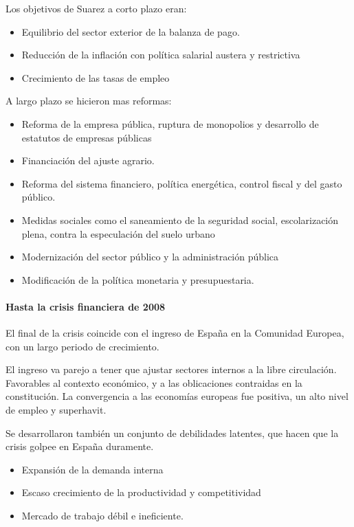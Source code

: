             Los objetivos de Suarez a corto plazo eran:
            \begin{itemize}
                \item Equilibrio del sector exterior de la balanza de pago.
                \item Reducción de la inflación con política salarial austera y restrictiva
                \item Crecimiento de las tasas de empleo
            \end{itemize}
            A largo plazo se hicieron mas reformas:
            \begin{itemize}
                \item Reforma de la empresa pública, ruptura de monopolios y desarrollo de estatutos de empresas públicas
                \item Financiación del ajuste agrario.
                \item Reforma del sistema financiero, política energética, control fiscal y del gasto público. 
                \item Medidas sociales como el saneamiento de la seguridad social, escolarización plena, contra la especulación del suelo urbano
                \item Modernización del sector público y la administración pública
                \item Modificación de la política monetaria y presupuestaria.
            \end{itemize}

        \paragraph{Hasta la crisis financiera de 2008} %
            El final de la crisis coincide con el ingreso de España en la Comunidad Europea, con un largo periodo de crecimiento.

            El ingreso va parejo a tener que ajustar sectores internos a la libre circulación. Favorables al contexto económico, y a las oblicaciones contraidas en la constitución. La convergencia a las economías europeas fue positiva, un alto nivel de empleo y superhavit.

            Se desarrollaron también un conjunto de debilidades latentes, que hacen que la crisis golpee en España duramente.
            \begin{itemize}
                \item Expansión de la demanda interna
                \item Escaso crecimiento de la productividad y competitividad
                \item Mercado de trabajo débil e ineficiente.
            \end{itemize}

